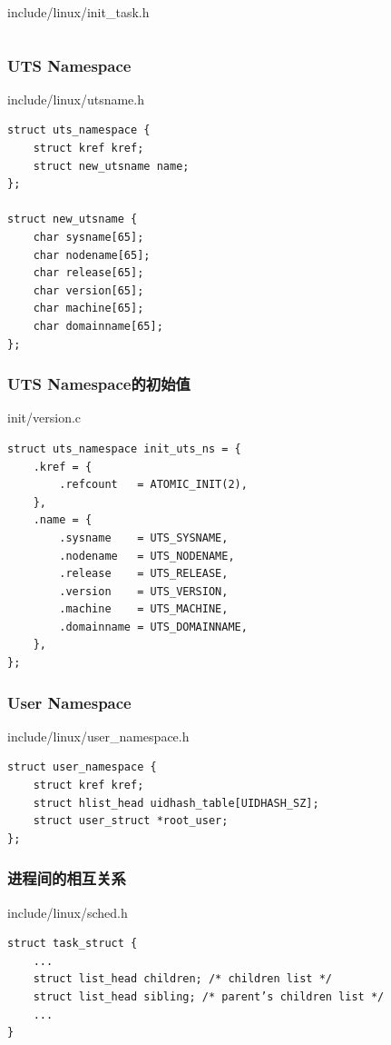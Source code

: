\documentclass[xcolor=svgnames]{beamer}
\begin{document}
\begin{CJK*}{UTF8}{gbsn}
\begin{frame}[fragile]
\begin{block}{include/linux/init\_task.h}
\begin{verbatim}
\end{verbatim}
\end{block}
\end{frame}

\begin{frame}[fragile]
\frametitle{UTS Namespace}
\begin{block}{include/linux/utsname.h}
\begin{verbatim}
struct uts_namespace {
    struct kref kref;
    struct new_utsname name;
};

struct new_utsname {
    char sysname[65];
    char nodename[65];
    char release[65];
    char version[65];
    char machine[65];
    char domainname[65];
};
\end{verbatim}
\end{block}
\end{frame}
\begin{frame}[fragile]
\frametitle{UTS Namespace的初始值}
\begin{block}{init/version.c}
\begin{verbatim}
struct uts_namespace init_uts_ns = {
    .kref = {
        .refcount   = ATOMIC_INIT(2),
    },
    .name = {
        .sysname    = UTS_SYSNAME,
        .nodename   = UTS_NODENAME,
        .release    = UTS_RELEASE,
        .version    = UTS_VERSION,
        .machine    = UTS_MACHINE,
        .domainname = UTS_DOMAINNAME,
    },
};
\end{verbatim}
\end{block}
\end{frame}

\begin{frame}[fragile]
\frametitle{User Namespace}
\begin{block}{include/linux/user\_namespace.h}
\begin{verbatim}
struct user_namespace {
    struct kref kref;
    struct hlist_head uidhash_table[UIDHASH_SZ];
    struct user_struct *root_user;
};
\end{verbatim}
\end{block}
\end{frame}

\begin{frame}[fragile]
\frametitle{进程间的相互关系}
\begin{block}{include/linux/sched.h}
\begin{verbatim}
struct task_struct {
    ...
    struct list_head children; /* children list */
    struct list_head sibling; /* parent’s children list */
    ...
}
\end{verbatim}
\end{block}
\end{frame}


\end{CJK*}
\end{document}
